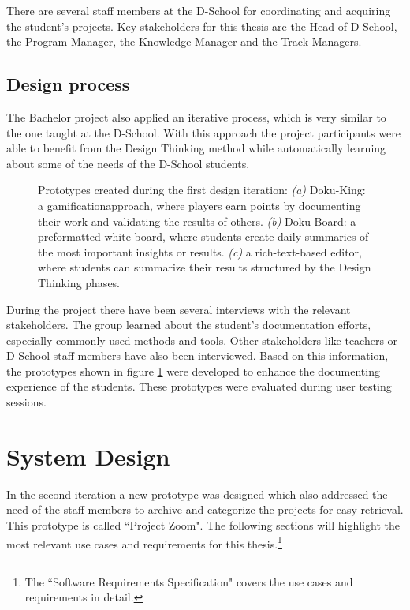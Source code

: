 There are several staff members at the D-School for coordinating and acquiring the student's projects. Key stakeholders for this thesis are the Head of D-School, the Program Manager, the Knowledge Manager and the Track Managers.

\section{Design process}
The Bachelor project also applied an iterative process, which is very similar to the one taught at the D-School. With this approach the project participants were able to benefit from the Design Thinking method while automatically learning about some of the needs of the D-School students.

\begin{figure}
\caption[Prototypes created during the first design iteration]{Prototypes created during the first design iteration: \textit{(a)} Doku-King: a gamification\footnotemark approach, where players earn points by documenting their work and validating the results of others. \textit{(b)} Doku-Board: a preformatted white board, where students create daily summaries of the most important insights or results. \textit{(c)} a rich-text-based editor, where students can summarize their results structured by the Design Thinking phases.}
\label{fig:First_prototypes}
\end{figure}


During the project there have been several interviews with the relevant stakeholders. The group learned about the student's documentation efforts, especially commonly used methods and tools. Other stakeholders like teachers or D-School staff members have also been interviewed. Based on this information, the prototypes shown in figure \ref{fig:First_prototypes} were developed to enhance the documenting experience of the students. These prototypes were evaluated during user testing sessions.

\chapter{System Design}
In the second iteration a new prototype was designed which also addressed the need of the staff members to archive and categorize the projects for easy retrieval. This prototype is called ``Project Zoom". The following sections will highlight the most relevant use cases and requirements for this thesis.\footnote{The ``Software Requirements Specification"\cite{ReqSpec} covers the use cases and requirements in detail.}

